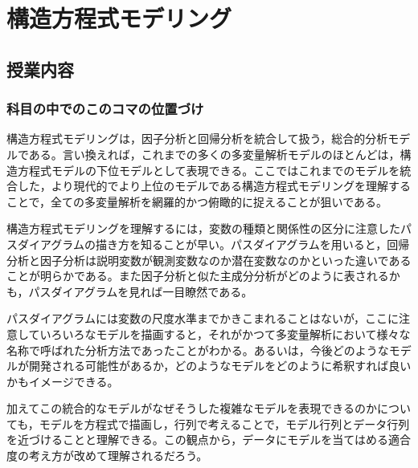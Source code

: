 \section{構造方程式モデリング}
\subsection{授業内容}
\subsubsection{科目の中でのこのコマの位置づけ}
構造方程式モデリングは，因子分析と回帰分析を統合して扱う，総合的分析モデルである。言い換えれば，これまでの多くの多変量解析モデルのほとんどは，構造方程式モデルの下位モデルとして表現できる。ここではこれまでのモデルを統合した，より現代的でより上位のモデルである構造方程式モデリングを理解することで，全ての多変量解析を網羅的かつ俯瞰的に捉えることが狙いである。

構造方程式モデリングを理解するには，変数の種類と関係性の区分に注意したパスダイアグラムの描き方を知ることが早い。パスダイアグラムを用いると，回帰分析と因子分析は説明変数が観測変数なのか潜在変数なのかといった違いであることが明らかである。また因子分析と似た主成分分析がどのように表されるかも，パスダイアグラムを見れば一目瞭然である。

パスダイアグラムには変数の尺度水準までかきこまれることはないが，ここに注意していろいろなモデルを描画すると，それがかつて多変量解析において様々な名称で呼ばれた分析方法であったことがわかる。あるいは，今後どのようなモデルが開発される可能性があるか，どのようなモデルをどのように希釈すれば良いかもイメージできる。

加えてこの統合的なモデルがなぜそうした複雑なモデルを表現できるのかについても，モデルを方程式で描画し，行列で考えることで，モデル行列とデータ行列を近づけることと理解できる。この観点から，データにモデルを当てはめる適合度の考え方が改めて理解されるだろう。
